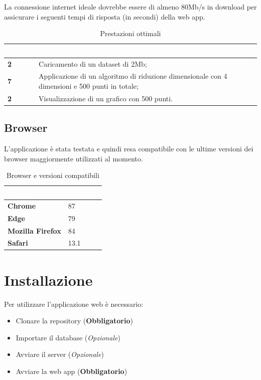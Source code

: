 \newpage

La connessione internet ideale dovrebbe essere di almeno 80Mb/s in download per assicurare i seguenti tempi di risposta (in secondi) della web app. 
{
\setlength\arrayrulewidth{0.95pt}
\renewcommand{\arraystretch}{1.5}
\begin{longtable}{C{2cm} | C{10cm}}

\textcolor{white}{\textbf{Tempo}}&
\textcolor{white}{\textbf{Operazione}} \\
\endfirsthead
\endfoot
{}\caption{Prestazioni ottimali}
\endlastfoot
	
	\textbf{2} &
	Caricamento di un dataset di 2Mb;  \\
 
	\textbf{7} & 
	Applicazione di un algoritmo  di riduzione dimensionale con 4 dimensioni e 500 punti in totale; \\
	
	\textbf{2} &
	Visualizzazione di un grafico con 500 punti.  \\	
	
\end{longtable}	
}

\subsection{Browser}
L'applicazione è stata testata e quindi resa compatibile con le ultime versioni dei browser maggiormente utilizzati al momento.
{
\setlength\arrayrulewidth{0.95pt}
\renewcommand{\arraystretch}{1.5}
\begin{longtable}{C{4cm} | C{4cm}}

\textcolor{white}{\textbf{Browser}}&
\textcolor{white}{\textbf{Versione}} \\
\endfirsthead
\endfoot
{}\caption{Browser e versioni compatibili}
\endlastfoot
	
	\textbf{Chrome} &
	 87 \\
 
	\textbf{Edge} & 
	79\\
	
	\textbf{Mozilla Firefox} &
	 84 \\
 
	\textbf{Safari} & 
	13.1 \\
	
\end{longtable}	
}

\newpage

\section{Installazione}
Per utilizzare l'applicazione web è necessario:
\begin{itemize}
\item Clonare la repository (\textbf{Obbligatorio})
\item Importare il database (\textit{Opzionale})
\item Avviare il server (\textit{Opzionale})
\item Avviare la web app (\textbf{Obbligatorio})
\end{itemize}
